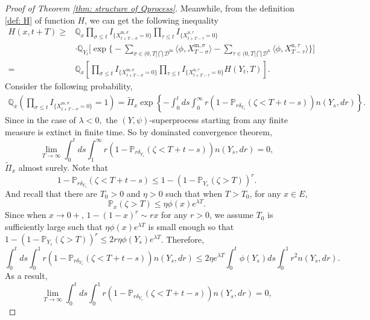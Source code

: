 \documentclass[12pt,a4paper]{amsart}
\theoremstyle{plain}
\theoremstyle{definition}
\numberwithin{equation}{section}
\begin{document}
\begin{proof}[Proof of Theorem \ref{thm: structure of Qprocess}]
Meanwhile, from the definition
\eqref{def: H} of function $H$, we can get the following inequality
\begin{equation}\label{subsub}
\begin{aligned}
     H(x,t+T)\geq& \mathbb Q_{x}\prod_{\sigma\leq t}I_{\{ X_{t+T-\sigma}^{{\mathrm m},\sigma}=0\}}\prod_{\tau\leq t}I_{\{ X_{t+T-\tau}^{{\mathrm n},\tau}=0\}}\\
&\cdot\mathbb Q_{Y_t}\Big[\exp\Big\{-\sum_{\sigma\in (0, T]\bigcap \mathcal D^{\mathrm m}}\langle \phi, X_{T-\sigma}^{{\mathrm m},\sigma}\rangle -\sum_{\tau\in (0, T]\bigcap \mathcal D^{\mathrm n}}\langle \phi, X_{T-\tau}^{{\mathrm n},\tau}\rangle \Big\}\Big]\\
=& \mathbb Q_{x}\left[\prod_{\sigma\leq t}I_{\{ X_{t+T-\sigma}^{{\mathrm m},\sigma}=0\}}\prod_{\tau\leq t}I_{\{ X_{t+T-\tau}^{{\mathrm n},\tau}=0\}}H(Y_t, T)\right].
\end{aligned}
\end{equation}
Consider the following probability,
\begin{eqnarray*}
\mathbb Q_{x}\left(\prod_{\sigma\leq t}I_{\{ X_{t+T-\sigma}^{{\mathrm m},\sigma}=0\}}=1\right)
=\widetilde\Pi_x\exp\left\{-\int_0^tds\int_0^\infty r(1-\mathbb P_{r\delta_{Y_s}}(\zeta<T+t-s))n(Y_s,dr)\right\}.
\end{eqnarray*}
Since in the case of $\lambda<0,$ the $(Y,\psi)$-superprocess starting from any finite measure is extinct in
finite time.  So by dominated convergence theorem,
\begin{equation}\label{1infty limit}
\lim_{T\rightarrow\infty}\int_0^tds\int_1^\infty r(1-\mathbb P_{r\delta_{Y_s}}(\zeta<T+t-s))n(Y_s,dr)=0,
\end{equation}
$\widetilde\Pi_x$ almost surely.   Note that
\[
1-\mathbb P_{r\delta_{Y_s}}(\zeta<T+t-s)\leq 1-(1-\mathbb P_{Y_s}(\zeta>T))^r.
\]
And recall that there are $T_0>0$ and $\eta>0$ such that when $T>T_0$, for any $x\in E$,
\[
\mathbb P_x(\zeta>T)\leq \eta \phi(x)e^{\lambda T}.
\]
Since when $x\rightarrow 0+$, $1-(1-x)^r\sim rx$ for any $r>0$, we assume $T_0$ is sufficiently large such that
$\eta \phi(x)e^{\lambda T}$ is small enough so that $1-(1-\mathbb P_{Y_s}(\zeta>T))^r\leq 2r\eta \phi(Y_s)e^{\lambda T}$.
Therefore,
\[
\int_0^tds\int_0^1 r(1-\mathbb P_{r\delta_{ Y_s}}(\zeta<T+t-s))n(Y_s,dr)\leq 2\eta e^{\lambda T}\int_0^t\phi(Y_s)ds\int_0^1 r^2 n(Y_s,dr).
\]
As a result,
\begin{equation}\label{01limit}
\lim_{T\rightarrow\infty}\int_0^tds\int_0^1 r(1-\mathbb P_{r\delta_{Y_s}}(\zeta<T+t-s))n(Y_s,dr)=0,

\end{equation}
\end{proof}
\end{document}

